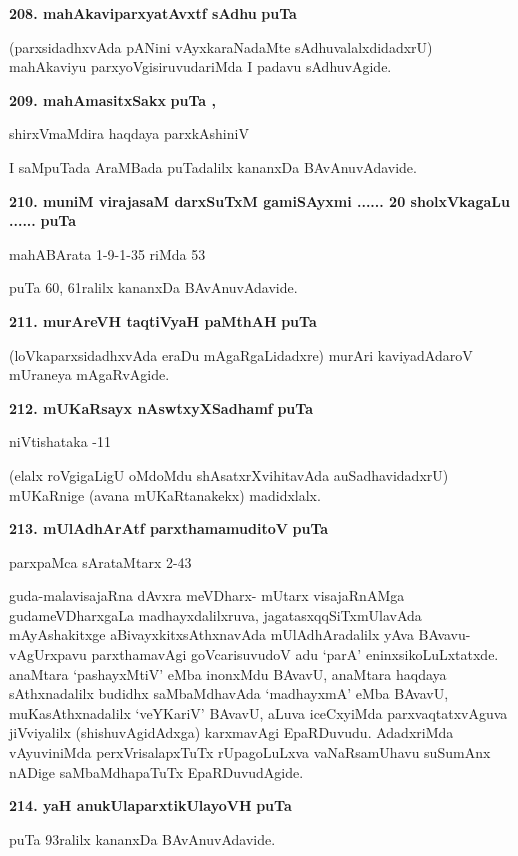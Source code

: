 \medskip
\noindent
\textbf{208. mahAkaviparxyatAvxtf sAdhu} \hfill{\bf puTa \pageref{216}}

\smallskip
(parxsidadhxvAda pANini vAyxkaraNadaMte sAdhuvalalxdidadxrU) mahAkaviyu parxyoVgisiruvudariMda I padavu sAdhuvAgide.

\medskip
\noindent
\textbf{209. mahAmasitxSakx} \hfill{\bf puTa \pageref{81a}, \pageref{103b}}

\hfill{shirxVmaMdira haqdaya parxkAshiniV}

\smallskip
I saMpuTada AraMBada puTadalilx kananxDa BAvAnuvAdavide.

\medskip
\noindent
\textbf{210. muniM virajasaM darxSuTxM gamiSAyxmi ...... 20 sholxVkagaLu ......} \hfill{\bf puTa \pageref{58}}

\hfill{mahABArata 1-9-1-35 riMda 53}

\smallskip
puTa 60, 61ralilx kananxDa BAvAnuvAdavide.

\noindent
\textbf{211. murAreVH taqtiVyaH paMthAH} \hfill{\bf puTa \pageref{248}}

\smallskip
(loVkaparxsidadhxvAda eraDu mAgaRgaLidadxre) murAri kaviyadAdaroV mUraneya mAgaRvAgide.

\medskip
\noindent
\textbf{212. mUKaRsayx nAswtxyXSadhamf} \hfill{\bf puTa \pageref{189}}

\hfill{niVtishataka -11}

(elalx roVgigaLigU oMdoMdu shAsatxrXvihitavAda auSadhavidadxrU) mUKaRnige (avana mUKaRtanakekx) madidxlalx.

\medskip
\noindent
\textbf{213. mUlAdhArAtf parxthamamuditoV} \hfill{\bf puTa \pageref{152}}

\hfill{parxpaMca sArataMtarx 2-43}

\smallskip
guda-malavisajaRna dAvxra meVDharx- mUtarx visajaRnAMga gudameVDharxgaLa madhayxdalilxruva, jagatasxqqSiTxmUlavAda mAyAshakitxge aBivayxkitxsAthxnavAda mUlAdhAradalilx yAva BAvavu-vAgUrxpavu parxthamavAgi goVcarisuvudoV adu `parA' eninxsikoLuLxtatxde. anaMtara `pashayxMtiV' eMba inonxMdu BAvavU, anaMtara haqdaya sAthxnadalilx budidhx saMbaMdhavAda `madhayxmA' eMba BAvavU, muKasAthxnadalilx `veYKariV' BAvavU, aLuva iceCxyiMda parxvaqtatxvAguva jiVviyalilx (shishuvAgidAdxga) karxmavAgi EpaRDuvudu. AdadxriMda vAyuviniMda perxVrisalapxTuTx rUpagoLuLxva vaNaRsamUhavu suSumAnx nADige saMbaMdhapaTuTx EpaRDuvudAgide.

\medskip
\noindent
\textbf{214. yaH anukUlaparxtikUlayoVH} \hfill{\bf puTa \pageref{94}}

\smallskip
puTa 93ralilx kananxDa BAvAnuvAdavide.

